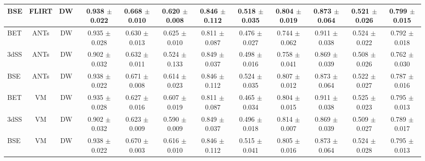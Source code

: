 \begin{table*}[t]
{\begin{tabular}{lccccccccccc}
    BSE \cite{shattuck2002brainsuite} & FLIRT \cite{jenkinson2001global} &DW~\cite{jaderberg2015spatial} &0.938  $\pm$ 0.022
& 0.668  $\pm$ 0.010 &
0.620  $\pm$ 0.008  & 0.846  $\pm$ 0.112 &
0.518  $\pm$ 0.035 &
0.804  $\pm$ 0.019 &
 0.873  $\pm$ 0.064 &
0.521  $\pm$ 0.026 &
0.799  $\pm$ 0.015
 \\

    \midrule

    BET \cite{smith2002fast} & ANTs \cite{avants2009advanced} & DW~\cite{jaderberg2015spatial} & 0.935  $\pm$ 0.028 & 0.630  $\pm$ 0.013 &
0.625  $\pm$ 0.010  & 0.811  $\pm$ 0.087 &
0.476  $\pm$ 0.027 &
0.744  $\pm$ 0.062 &
 0.911  $\pm$ 0.038 &
0.524  $\pm$ 0.022 &
0.792  $\pm$ 0.018

 \\

    3dSS \cite{cox1996afni} & ANTs \cite{avants2009advanced} & DW~\cite{jaderberg2015spatial} & 0.902  $\pm$ 0.032 &
0.632  $\pm$ 0.011 &
0.524  $\pm$ 0.133  & 0.849  $\pm$ 0.037 &
0.498  $\pm$ 0.016 &
0.758  $\pm$ 0.041 &
 0.869  $\pm$ 0.039 &
0.508  $\pm$ 0.026 &
0.762  $\pm$ 0.030\\

    BSE \cite{shattuck2002brainsuite} & ANTs \cite{avants2009advanced} &DW~\cite{jaderberg2015spatial} & 0.938  $\pm$ 0.022 &
0.671  $\pm$ 0.008 &
0.614  $\pm$ 0.023  & 0.846  $\pm$ 0.112 &
0.524  $\pm$ 0.035 &
0.807  $\pm$ 0.012 &
 0.873  $\pm$ 0.064 &
0.522  $\pm$ 0.027 &
0.787  $\pm$ 0.016\\
    \midrule

        BET \cite{smith2002fast} & VM \cite{balakrishnan2018unsupervised} & DW~\cite{jaderberg2015spatial} & 0.935  $\pm$ 0.028 &
0.627 $\pm$ 0.016 &
0.607 $\pm$ 0.019  & 0.811  $\pm$ 0.087 &
0.465 $\pm$ 0.034 &
0.804 $\pm$ 0.015 &
 0.911  $\pm$ 0.038 &
0.525 $\pm$ 0.023 &
0.795 $\pm$ 0.013 \\

    3dSS \cite{cox1996afni} & VM \cite{balakrishnan2018unsupervised} & DW~\cite{jaderberg2015spatial} &0.902  $\pm$ 0.032 &
0.623 $\pm$ 0.009 &
0.590 $\pm$ 0.009  & 0.849  $\pm$ 0.037 &
0.496 $\pm$ 0.018 &
0.814 $\pm$ 0.007 &
 0.869  $\pm$ 0.039 &
0.509 $\pm$ 0.027 &
0.789 $\pm$ 0.017\\

    BSE \cite{shattuck2002brainsuite} & VM \cite{balakrishnan2018unsupervised} &DW~\cite{jaderberg2015spatial} & 0.938  $\pm$ 0.022 &
0.670 $\pm$ 0.003 &
0.616 $\pm$ 0.010  & 0.846  $\pm$ 0.112 &
0.515 $\pm$ 0.041 &
0.805 $\pm$ 0.016 &
 0.873  $\pm$ 0.064 &
0.524 $\pm$ 0.028 &
0.795 $\pm$ 0.013\\
    \midrule


\end{tabular}}
\end{table*}
